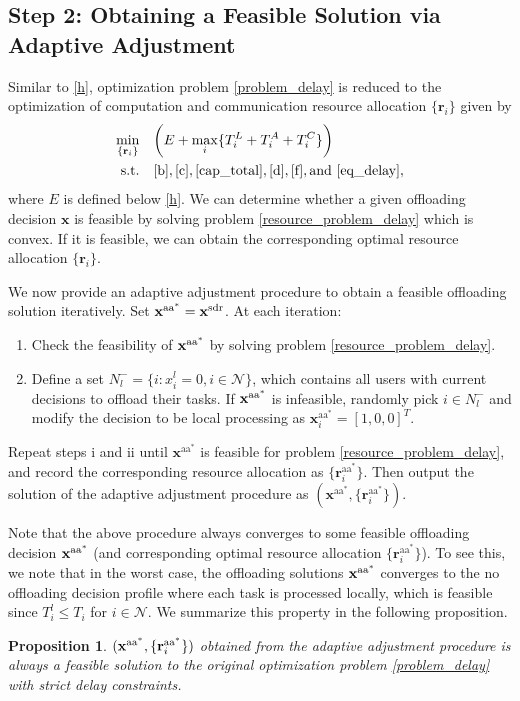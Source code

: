 \documentclass[10pt,journal,compsoc]{IEEEtran}
\newtheorem{Prop}{Proposition}
\def\rbf{{\bf r}}
\def\xbf{{\bf x}}
\def\rbf{{\bf r}}
\def\xbf{{\bf x}}
\begin{document}
{\subsection{Step 2: Obtaining a Feasible Solution via Adaptive Adjustment }


Similar to \eqref{h}, optimization problem \eqref{problem_delay} is
reduced to the optimization of computation and communication
resource allocation $\{ \mathbf{r}_i \}$ given by
\begin{align}
\min\limits_{\{\textbf{r}_i\}}
&\quad \bigg(E+\max_{i}\{T^L_{i}+T^A_{i}+T^C_{i}\}\bigg)\label{resource_problem_delay}\\
\text{s.t.} &\quad
\eqref{b},\eqref{c},\eqref{cap_total},\eqref{d},\eqref{f},
\mathrm{and}\ \eqref{eq_delay},\nonumber
\end{align}
where $E$ is defined below \eqref{h}. We can determine whether a given offloading decision
$\mathbf{x}$ is feasible by solving  problem \eqref{resource_problem_delay} which is convex. If it is feasible, we can obtain
the corresponding optimal resource allocation $\{\mathbf{r}_i\}$.


We now provide an adaptive adjustment procedure to obtain a feasible
offloading solution iteratively. Set
$\xbf^{\text{aa}^*}=\xbf^{\text{sdr}}$. At each iteration:
 \renewcommand{\labelenumi}{\roman{enumi}}
 \begin{enumerate}
 \item Check the
feasibility of $\xbf^{\text{aa}^*}$ by solving problem
\eqref{resource_problem_delay}.
 \item Define a set $N_l^- = \{i:
x_i^l = 0, i\in \mathcal{N}\}$, which contains all users with
current decisions to offload their tasks. If $\xbf^{\text{aa}^*}$ is
infeasible, randomly pick $i \in N_l^-$ and modify the decision to
be local processing as $\mathbf{x}^{\text{aa}^*}_{i}=[1,0,0]^T$.
 \end{enumerate}
Repeat steps i and ii until $\mathbf{x}^{\text{aa}^*}$ is feasible
for problem \eqref{resource_problem_delay}, and record the
corresponding resource allocation as
$\{\mathbf{r}_i^{\text{aa}^*}\}$. Then output the solution of the
adaptive adjustment procedure as
$(\mathbf{x}^{\text{aa}^*},\{\mathbf{r}_i^{\text{aa}^*}\})$.


Note that the above procedure always converges to some feasible
offloading decision $\xbf^{\text{aa}^*}$ (and corresponding optimal
resource allocation $\{ \mathbf{r}_i^{\text{aa}^*} \}$). To see
this, we note that in the worst case, the offloading solutions
$\xbf^{\text{aa}^*}$ converges to the no offloading decision profile
where each task is processed locally, which is
 feasible since $T_i^l \leq T_i$ for $i\in\mathcal{N}$. We summarize this
 property in the following proposition.
 \begin{Prop}\label{lem.AA} \it
$(\xbf^{\text{aa}^*},\{\rbf^{\text{aa}^*}_i\})$ obtained from the
adaptive adjustment procedure is always a feasible solution to the
original optimization problem \eqref{problem_delay} with strict
delay constraints.
\end{Prop}

}
\end{document}

